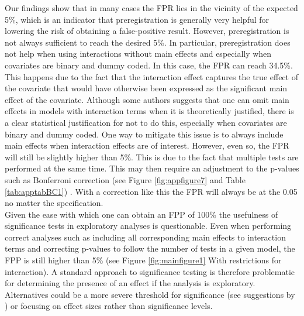 
Our findings show that in many cases the FPR lies in the vicinity of the expected 5\%, which is an indicator that preregistration is generally very helpful for lowering the risk of obtaining a false-positive result. However, preregistration is not always sufficient to reach the desired 5\%. In particular, preregistration does not help when using interactions without main effects and especially when covariates are binary and dummy coded. In this case, the FPR can reach 34.5\%. This happens due to the fact that the interaction effect captures the true effect of the covariate that would have otherwise been expressed as the significant main effect of the covariate. Although some authors suggests that one can omit main effects in models with interaction terms when it is theoretically justified, there is a clear statistical justification for not to do this, especially when covariates are binary and dummy coded. One way to mitigate this issue is to always include main effects when interaction effects are of interest. However, even so, the FPR will still be slightly higher than 5\%. This is due to the fact that multiple tests are performed at the same time. This may then require an adjustment to the p-values such as Bonferroni correction (see Figure \ref{fig:appfigure7} and Table \ref{tab:apptabBC1}) \citep{dunn1961multiple}. With a correction like this the FPR will always be at the 0.05 no matter the specification. \\

Given the ease with which one can obtain an FPP of 100\% the usefulness of significance tests in exploratory analyses is questionable. Even when performing correct analyses such as including all corresponding main effects to interaction terms and correcting p-values to follow the number of tests in a given model, the FPP is still higher than 5\% (see Figure \ref{fig:mainfigure1} With restrictions for interaction). A standard approach to significance testing is therefore problematic for determining the presence of an effect if the analysis is exploratory. Alternatives could be a more severe threshold for significance (see suggestions by \cite{benjamin2018}) or focusing on effect sizes rather than significance levels. \\
    
